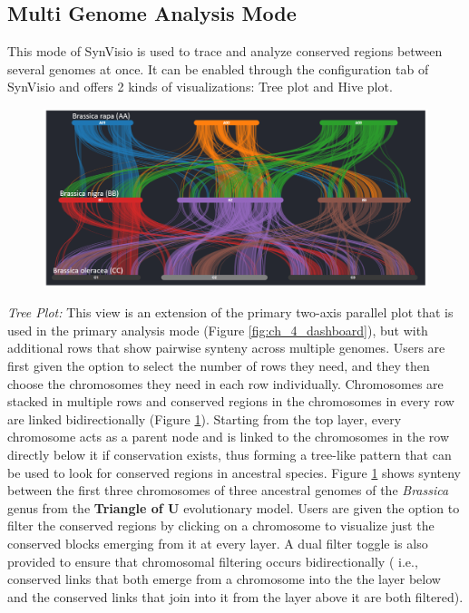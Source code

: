 \subsection{Multi Genome Analysis Mode}
This mode of SynVisio is used to trace and analyze conserved regions between several genomes at once. It can be enabled through the configuration tab of SynVisio and offers 2 kinds of visualizations: Tree plot and Hive plot.

\begin{figure}
  \centering
  \includegraphics[width=1\linewidth]{images/ch_5_tree_plot.PNG}
  \label{fig:ch_5_tree_plot}
\end{figure} 

\textit{Tree Plot:} This view is an extension of the primary two-axis parallel plot that is used in the primary analysis mode (Figure \ref{fig:ch_4_dashboard}), but with additional rows that show pairwise synteny across multiple genomes. Users are first given the option to select the number of rows they need, and they then choose the chromosomes they need in each row individually. Chromosomes are stacked in multiple rows and conserved regions in the chromosomes in every row are linked bidirectionally (Figure \ref{fig:ch_5_tree_plot}). Starting from the top layer, every chromosome acts as a parent node and is linked to the chromosomes in the row directly below it if conservation exists, thus forming a tree-like pattern that can be used to look for conserved regions in ancestral species. Figure \ref{fig:ch_5_tree_plot} shows synteny between the first three chromosomes of three ancestral genomes of the \textit{Brassica} genus from the \textbf{Triangle of U} evolutionary model\cite{cheng2014genome}. Users are given the option to filter the conserved regions by clicking on a chromosome to visualize just the conserved blocks emerging from it at every layer. A dual filter toggle is also provided to ensure that chromosomal filtering occurs bidirectionally ( i.e., conserved links that both emerge from a chromosome into the the layer below and the conserved links that join into it from the layer above it are both filtered).

